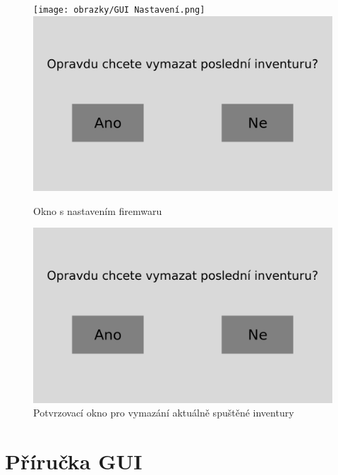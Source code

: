 \begin{figure}[H]
    \begin{center}
        \texttt{[image: obrazky/GUI Nastavení.png]}
        \includegraphics[scale=0.2]{obrazky/GUI Vymazání inventury.png}
    \end{center}
    \caption{Okno s nastavením firemwaru}
    \label{Okno s nastavením aplikace}
\end{figure}

\begin{figure}[H]
    \begin{center}
        \includegraphics[scale=0.4]{obrazky/GUI Vymazání inventury.png}
    \end{center}
    \caption{Potvrzovací okno pro vymazání aktuálně spuštěné inventury}
    \label{Potvrzovací okno pro vymazání aktuálně spuštěné inventury}
\end{figure}



\chapter{Příručka GUI}
